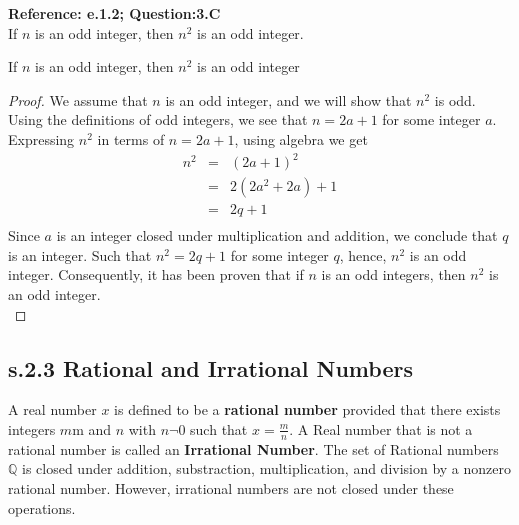 \begin{example}
{\bf Reference: e.1.2; Question:3.C} \\
If $n$ is an odd integer, then $n^2$ is an odd integer. \\

\begin{tcolorbox}
	\begin{theorem}
		If $n$ is an odd integer, then $n^2$ is an odd integer
	\end{theorem}
\end{tcolorbox}

\begin{proof}
We assume that $n$ is an odd integer, and we will show that $n^2$ is odd. Using the definitions of odd integers, we see that $n = 2a + 1$ for some integer $a$. Expressing $n^2$ in terms of $n = 2a + 1$, using algebra we get
\begin{eqnarray*}
n^2 & = & (2a + 1)^2  \nonumber \\
& = & 2(2a^2 + 2a) + 1 \nonumber \\
& = & 2q + 1 \nonumber \\
\end{eqnarray*}
Since $a$ is an integer closed under multiplication and addition, we conclude that $q$ is an integer. Such that $n^2 = 2q + 1$ for some integer $q$, hence, $n^2$ is an odd integer. Consequently, it has been proven that if $n$ is an odd integers, then $n^2$ is an odd integer. \\
\end{proof}
\end{example}



\subsection{s.2.3 Rational and Irrational Numbers}

\begin{definition}
A real number $x$ is defined to be a {\bf rational number} provided that there exists integers $m$m and $n$ with $n \neg 0$ such that $x = \frac{m}{n}$. A Real number that is not a rational number is called an {\bf Irrational Number}. The set of Rational numbers $\mathbb{Q}$ is closed under addition, substraction, multiplication, and division by a nonzero rational number. However, irrational numbers are not closed under these operations. 
\end{definition}






